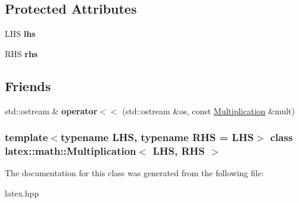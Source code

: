 \subsection*{\-Protected \-Attributes}
\begin{DoxyCompactItemize}
\item 
\hypertarget{classlatex_1_1math_1_1Multiplication_a4023853877f13a570cb9b576f92fa5ee}{\-L\-H\-S {\bfseries lhs}}\label{classlatex_1_1math_1_1Multiplication_a4023853877f13a570cb9b576f92fa5ee}

\item 
\hypertarget{classlatex_1_1math_1_1Multiplication_a032c65778b9166b745136e6b6349a064}{\-R\-H\-S {\bfseries rhs}}\label{classlatex_1_1math_1_1Multiplication_a032c65778b9166b745136e6b6349a064}

\end{DoxyCompactItemize}
\subsection*{\-Friends}
\begin{DoxyCompactItemize}
\item 
\hypertarget{classlatex_1_1math_1_1Multiplication_ad1e78a956a232d4eb730bd2fef03ea65}{std\-::ostream \& {\bfseries operator$<$$<$} (std\-::ostream \&os, const \hyperlink{classlatex_1_1math_1_1Multiplication}{\-Multiplication} \&mult)}\label{classlatex_1_1math_1_1Multiplication_ad1e78a956a232d4eb730bd2fef03ea65}

\end{DoxyCompactItemize}
\subsubsection*{template$<$typename \-L\-H\-S, typename \-R\-H\-S = \-L\-H\-S$>$ class latex\-::math\-::\-Multiplication$<$ L\-H\-S, R\-H\-S $>$}



\-The documentation for this class was generated from the following file\-:\begin{DoxyCompactItemize}
\item 
latex.\-hpp\end{DoxyCompactItemize}
